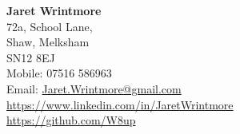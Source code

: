 \documentclass[a4paper,9pt]{extarticle}
\author{Jaret Wrintmore}
\begin{document}
\pagestyle{empty}

\begin{center}
\textbf{\Large Jaret Wrintmore}\\[2pt] %

\vspace{3mm}72a, School Lane,\\Shaw, Melksham\\ SN12 8EJ \\\vspace{1mm} Mobile: 07516 586963 \\\vspace{1mm} Email: \href{mailto:jaret.wrintmore@gmail.com}{Jaret.Wrintmore@gmail.com} \\\vspace{1mm}\url{https://www.linkedin.com/in/JaretWrintmore}\\ %
\url{https://github.com/W8up}
\end{center}








\end{document}
